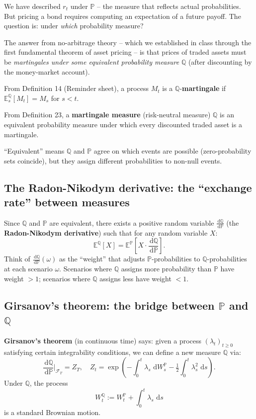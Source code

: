 \documentclass[11pt]{article}
\newcommand{\PP}{\mathbb{P}}
\newcommand{\QQ}{\mathbb{Q}}
\newcommand{\EE}{\mathbb{E}}
\newcommand{\FF}{\mathcal{F}}
\newcommand{\dd}{\,\mathrm{d}}
\begin{document}
We have described $r_t$ under $\PP$ -- the measure that reflects actual
probabilities.  But pricing a bond requires computing an expectation of a
future payoff.  The question is: under \emph{which} probability measure?

The answer from no-arbitrage theory -- which we established in class
through the first fundamental theorem of asset pricing -- is that prices
of traded assets must be \emph{martingales under some equivalent probability
measure} $\QQ$ (after discounting by the money-market account).

\begin{recall_box}
From Definition 14 (Reminder sheet), a process $M_t$ is a
$\QQ$-\textbf{martingale} if $\EE_s^\QQ[M_t] = M_s$ for $s<t$.

From Definition 23, a \textbf{martingale measure} (risk-neutral measure)
$\QQ$ is an equivalent probability measure under which every discounted
traded asset is a martingale.

``Equivalent'' means $\QQ$ and $\PP$ agree on which events are possible
(zero-probability sets coincide), but they assign different probabilities
to non-null events.
\end{recall_box}

\subsection{The Radon-Nikodym derivative: the ``exchange rate'' between measures}

Since $\QQ$ and $\PP$ are equivalent, there exists a positive random
variable $\frac{\dd\QQ}{\dd\PP}$ (the \textbf{Radon-Nikodym derivative})
such that for any random variable $X$:
\[
\EE^\QQ[X] = \EE^\PP\!\left[X \cdot \frac{\dd\QQ}{\dd\PP}\right].
\]
Think of $\frac{\dd\QQ}{\dd\PP}(\omega)$ as the ``weight'' that adjusts
$\PP$-probabilities to $\QQ$-probabilities at each scenario $\omega$.
Scenarios where $\QQ$ assigns more probability than $\PP$ have weight
$>1$; scenarios where $\QQ$ assigns less have weight $<1$.

\subsection{Girsanov's theorem: the bridge between $\PP$ and $\QQ$}

\textbf{Girsanov's theorem} (in continuous time) says: given a process
$(\lambda_t)_{t\ge 0}$ satisfying certain integrability conditions, we can
define a new measure $\QQ$ via:
\[
\frac{\dd\QQ}{\dd\PP}\bigg|_{\FF_T}
= Z_T,
\quad
Z_t = \exp\!\left(-\int_0^t \lambda_s\,\dd W_s^\PP - \tfrac{1}{2}\int_0^t \lambda_s^2\,\dd s\right).
\]
Under $\QQ$, the process
\[
W_t^\QQ := W_t^\PP + \int_0^t \lambda_s\,\dd s
\]
is a standard Brownian motion.
\end{document}
